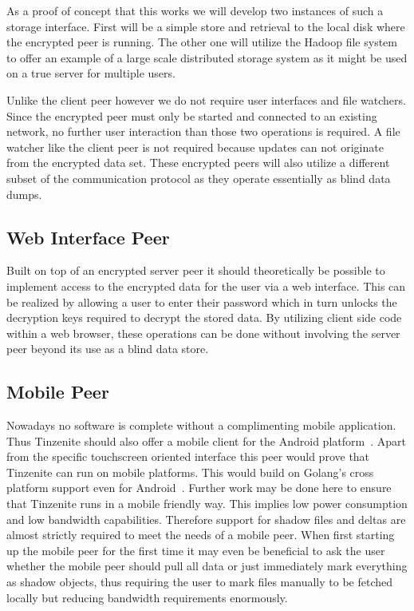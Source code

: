 As a proof of concept that this works we will develop two instances of such a storage interface.
First will be a simple store and retrieval to the local disk where the encrypted peer is running.
The other one will utilize the Hadoop file system to offer an example of a large scale distributed storage system as it might be used on a true server for multiple users.

Unlike the client peer however we do not require user interfaces and file watchers.
Since the encrypted peer must only be started and connected to an existing network, no further user interaction than those two operations is required.
A file watcher like the client peer is not required because updates can not originate from the encrypted data set.
These encrypted peers will also utilize a different subset of the communication protocol as they operate essentially as blind data dumps.

\subsection{Web Interface Peer}

Built on top of an encrypted server peer it should theoretically be possible to implement access to the encrypted data for the user via a web interface.
This can be realized by allowing a user to enter their password which in turn unlocks the decryption keys required to decrypt the stored data.
By utilizing client side code within a web browser, these operations can be done without involving the server peer beyond its use as a blind data store.

\subsection{Mobile Peer}

Nowadays no software is complete without a complimenting mobile application.
Thus Tinzenite should also offer a mobile client for the Android platform~\cite{web:site:android}.
Apart from the specific touchscreen oriented interface this peer would prove that Tinzenite can run on mobile platforms.
This would build on Golang's cross platform support even for Android~\cite{web:site:golang:mobile}.
Further work may be done here to ensure that Tinzenite runs in a mobile friendly way.
This implies low power consumption and low bandwidth capabilities.
Therefore support for shadow files and deltas are almost strictly required to meet the needs of a mobile peer.
When first starting up the mobile peer for the first time it may even be beneficial to ask the user whether the mobile peer should pull all data or just immediately mark everything as shadow objects, thus requiring the user to mark files manually to be fetched locally but reducing bandwidth requirements enormously.


